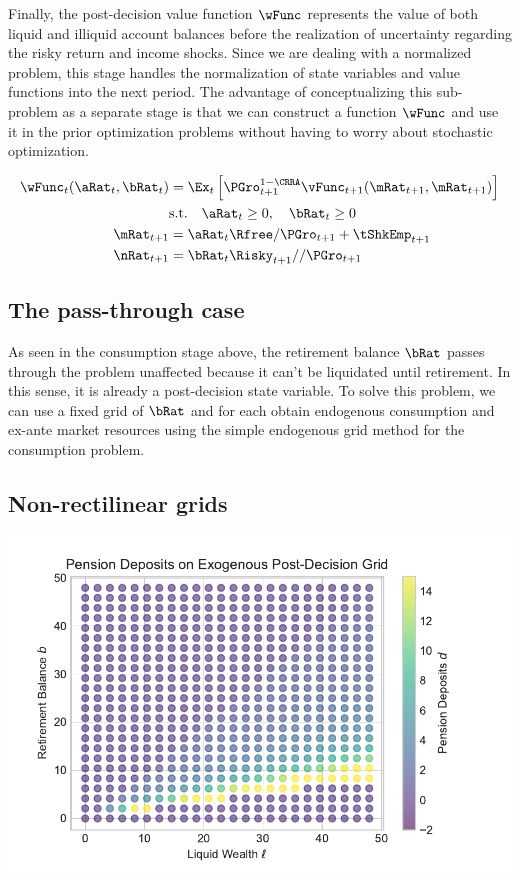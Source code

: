 \documentclass[\econtexRoot/EGMN]{subfiles}
\begin{document}
Finally, the post-decision value function $\wFunc$ represents the value of both liquid and illiquid account balances before the realization of uncertainty regarding the risky return and income shocks. Since we are dealing with a normalized problem, this stage handles the normalization of state variables and value functions into the next period. The advantage of conceptualizing this sub-problem as a separate stage is that we can construct a function $\wFunc$ and use it in the prior optimization problems without having to worry about stochastic optimization.

\begin{equation}
    \begin{split}
        \wFunc_{t}(\aRat_{t}, \bRat_{t}) & = \Ex_{t} \left[ \PGro_{t+1}^{1-\CRRA} \vFunc_{t+1}(\mRat_{t+1}, \mRat_{t+1}) \right] \\
        & \text{s.t.} \quad \aRat_{t} \ge 0, \quad \bRat_{t} \ge 0 \\
        \mRat_{t+1} & = \aRat_{t} \Rfree / \PGro_{t+1}  + \tShkEmp_{t+1} \\
        \nRat_{t+1} & = \bRat_{t} \Risky_{t+1} / / \PGro_{t+1}
    \end{split}
\end{equation}

\subsection{The pass-through case}

As seen in the consumption stage above, the retirement balance $\bRat$ passes through the problem unaffected because it can't be liquidated until retirement. In this sense, it is already a post-decision state variable. To solve this problem, we can use a fixed grid of $\bRat$ and for each obtain endogenous consumption and ex-ante market resources using the simple endogenous grid method for the consumption problem.

\subsection{Non-rectilinear grids}

\includegraphics[width=\textwidth]{Figures/ExogenousGrid.pdf}
\end{document}
